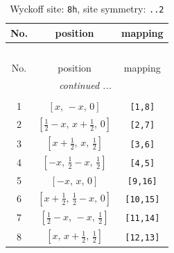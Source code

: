 \documentclass[fleqn,8pt]{jsarticle}
\begin{document}
\begin{longtable}{ccc}
\caption{Wyckoff site: {\tt 8h}, site symmetry: {\tt ..2}}
 \\
 \hline \hline
No. & position & mapping \\ \hline \endfirsthead

\multicolumn{2}{l}{\tablename\ \thetable{}} \\
 \hline \hline
No. & position & mapping \\ \hline \endhead

 \hline \hline
\multicolumn{2}{r}{\footnotesize\it continued ...} \\ \endfoot

 \hline \hline
\multicolumn{2}{r}{} \\ \endlastfoot

1 & $\left[ x,\, - x,\, 0 \right]$ & {\tt [1,8]} \\ \hline
2 & $\left[ \frac{1}{2} - x,\, x + \frac{1}{2},\, 0 \right]$ & {\tt [2,7]} \\ \hline
3 & $\left[ x + \frac{1}{2},\, x,\, \frac{1}{2} \right]$ & {\tt [3,6]} \\ \hline
4 & $\left[ - x,\, \frac{1}{2} - x,\, \frac{1}{2} \right]$ & {\tt [4,5]} \\ \hline
5 & $\left[ - x,\, x,\, 0 \right]$ & {\tt [9,16]} \\ \hline
6 & $\left[ x + \frac{1}{2},\, \frac{1}{2} - x,\, 0 \right]$ & {\tt [10,15]} \\ \hline
7 & $\left[ \frac{1}{2} - x,\, - x,\, \frac{1}{2} \right]$ & {\tt [11,14]} \\ \hline
8 & $\left[ x,\, x + \frac{1}{2},\, \frac{1}{2} \right]$ & {\tt [12,13]} \\
\end{longtable}
\renewcommand{\arraystretch}{1.2}
\end{document}
